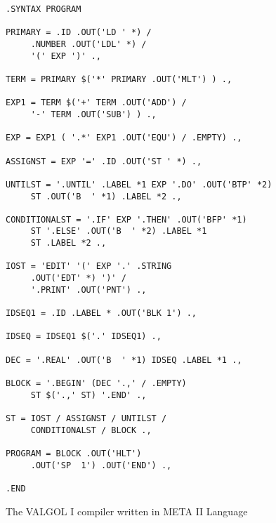 \documentclass[notitlepage,twocolumn]{report}
\begin{document}
\begin{figure}
  \caption{The VALGOL I compiler written in META II Language}
\begin{verbatim}
.SYNTAX PROGRAM

PRIMARY = .ID .OUT('LD ' *) /
     .NUMBER .OUT('LDL' *) /
     '(' EXP ')' .,

TERM = PRIMARY $('*' PRIMARY .OUT('MLT') ) .,

EXP1 = TERM $('+' TERM .OUT('ADD') /
     '-' TERM .OUT('SUB') ) .,

EXP = EXP1 ( '.*' EXP1 .OUT('EQU') / .EMPTY) .,

ASSIGNST = EXP '=' .ID .OUT('ST ' *) .,

UNTILST = '.UNTIL' .LABEL *1 EXP '.DO' .OUT('BTP' *2)
     ST .OUT('B  ' *1) .LABEL *2 .,

CONDITIONALST = '.IF' EXP '.THEN' .OUT('BFP' *1)
     ST '.ELSE' .OUT('B  ' *2) .LABEL *1
     ST .LABEL *2 .,

IOST = 'EDIT' '(' EXP '.' .STRING
     .OUT('EDT' *) ')' /
     '.PRINT' .OUT('PNT') .,

IDSEQ1 = .ID .LABEL * .OUT('BLK 1') .,

IDSEQ = IDSEQ1 $('.' IDSEQ1) .,

DEC = '.REAL' .OUT('B  ' *1) IDSEQ .LABEL *1 .,

BLOCK = '.BEGIN' (DEC '.,' / .EMPTY)
     ST $('.,' ST) '.END' .,

ST = IOST / ASSIGNST / UNTILST /
     CONDITIONALST / BLOCK .,

PROGRAM = BLOCK .OUT('HLT')
     .OUT('SP  1') .OUT('END') .,

.END
\end{verbatim}
\end{figure}
\end{document}
